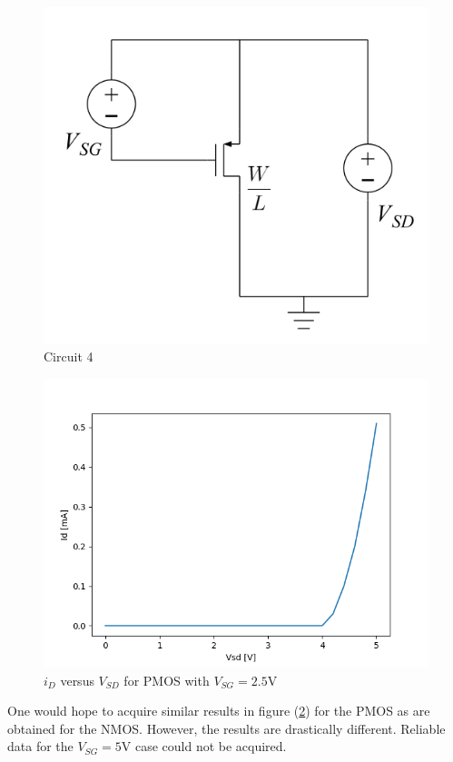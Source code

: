 \FloatBarrier

\begin{figure}[h!]
	\centering
	\includegraphics[scale=0.75]{./images/circuit_4.PNG}
	\caption{Circuit 4}
	\label{fig:circuit_4}
\end{figure}

\FloatBarrier

\FloatBarrier

\begin{figure}[h!]
	\centering
	\includegraphics[scale=0.75]{./images/data_4.PNG}
	\caption{$i_{D}$ versus $V_{SD}$ for PMOS with $V_{SG} = 2.5$\si{\volt}}
	\label{fig:data_4}
\end{figure}

\FloatBarrier

One would hope to acquire similar results in figure (\ref{fig:data_4}) for the PMOS as are obtained for the NMOS.
However, the results are drastically different.
Reliable data for the $V_{SG} = 5$\si{\volt} case could not be acquired.
